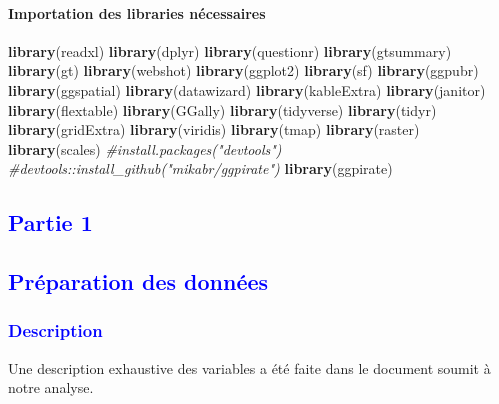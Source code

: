\documentclass[
]{article}
\newenvironment{Shaded}{\begin{snugshade}}{\end{snugshade}}
\newcommand{\CommentTok}[1]{\textcolor[rgb]{0.56,0.35,0.01}{\textit{#1}}}
\newcommand{\FunctionTok}[1]{\textcolor[rgb]{0.13,0.29,0.53}{\textbf{#1}}}
\newcommand{\NormalTok}[1]{#1}
\begin{document}
\newpage

\hypertarget{importation-des-libraries-nuxe9cessaires}{%
\paragraph{Importation des libraries
nécessaires}\label{importation-des-libraries-nuxe9cessaires}}

\hfill\break

\begin{Shaded}
\begin{Highlighting}[]
\FunctionTok{library}\NormalTok{(readxl)}
\FunctionTok{library}\NormalTok{(dplyr)}
\FunctionTok{library}\NormalTok{(questionr)}
\FunctionTok{library}\NormalTok{(gtsummary)}
\FunctionTok{library}\NormalTok{(gt)}
\FunctionTok{library}\NormalTok{(webshot)}
\FunctionTok{library}\NormalTok{(ggplot2)}
\FunctionTok{library}\NormalTok{(sf)}
\FunctionTok{library}\NormalTok{(ggpubr)}
\FunctionTok{library}\NormalTok{(ggspatial)}
\FunctionTok{library}\NormalTok{(datawizard)}
\FunctionTok{library}\NormalTok{(kableExtra)}
\FunctionTok{library}\NormalTok{(janitor)}
\FunctionTok{library}\NormalTok{(flextable)}
\FunctionTok{library}\NormalTok{(GGally)}
\FunctionTok{library}\NormalTok{(tidyverse)}
\FunctionTok{library}\NormalTok{(tidyr)}
\FunctionTok{library}\NormalTok{(gridExtra)}
\FunctionTok{library}\NormalTok{(viridis)}
\FunctionTok{library}\NormalTok{(tmap)}
\FunctionTok{library}\NormalTok{(raster)}
\FunctionTok{library}\NormalTok{(scales)}
\CommentTok{\#install.packages("devtools")}
\CommentTok{\#devtools::install\_github("mikabr/ggpirate")}
\FunctionTok{library}\NormalTok{(ggpirate)}
\end{Highlighting}
\end{Shaded}

\textcolor{blue}{\section{Partie 1}}
\textcolor{blue}{\subsection{Préparation des données}} 
\textcolor{blue}{\subsubsection{Description}}

\hfill\break
Une description exhaustive des variables a été faite dans le document
soumit à notre analyse.\\
\end{document}
